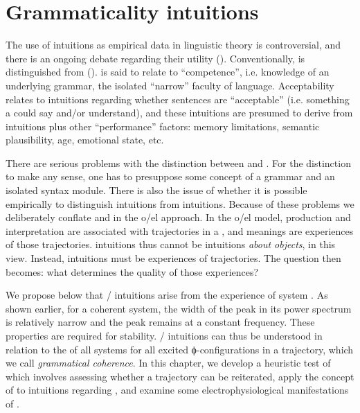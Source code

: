 \chapter{Grammaticality intuitions}

The use of  intuitions as empirical data in linguistic theory is controversial, and there is an ongoing debate regarding their utility (\citealt{CulicoverJackendoff2010,FFerreira2005,GibsonFedorenko2010,GibsonFedorenko2013,SprouseAlmeida2013}). Conventionally,  is distinguished from  (\citealt{Schütze2016,Sprouse2007}).  is said to relate to “competence”, i.e. knowledge of an underlying grammar, the isolated “narrow” faculty of language. Acceptability relates to intuitions regarding whether sentences are “acceptable” (i.e. something a  could say and/or understand), and these intuitions are presumed to derive from  intuitions plus other “performance” factors: memory limitations, semantic plausibility,  age, emotional state, etc. 

  There are serious problems with the distinction between  and . For the distinction to make any sense, one has to presuppose some concept of a grammar and an isolated syntax module. There is also the issue of whether it is possible empirically to distinguish  intuitions from  intuitions. Because of these problems we deliberately conflate  and  in the o/el approach. In the o/el model, production and interpretation are associated with trajectories in a , and meanings are experiences of those trajectories.  intuitions thus cannot be intuitions \textit{about objects}, in this view. Instead,  intuitions must be experiences of trajectories. The question then becomes: what determines the quality of those experiences? 

  We propose below that / intuitions arise from the experience of system . As shown earlier, for a coherent system, the width of the peak in its power spectrum is relatively narrow and the peak remains at a constant frequency. These properties are required for stability. / intuitions can thus be understood in relation to the  of all systems for all excited ϕ-configurations in a trajectory, which we call \textit{grammatical coherence}. In this chapter, we develop a heuristic test of  which involves assessing whether a trajectory can be reiterated, apply the concept of  to intuitions regarding , and examine some electrophysiological manifestations of . 

